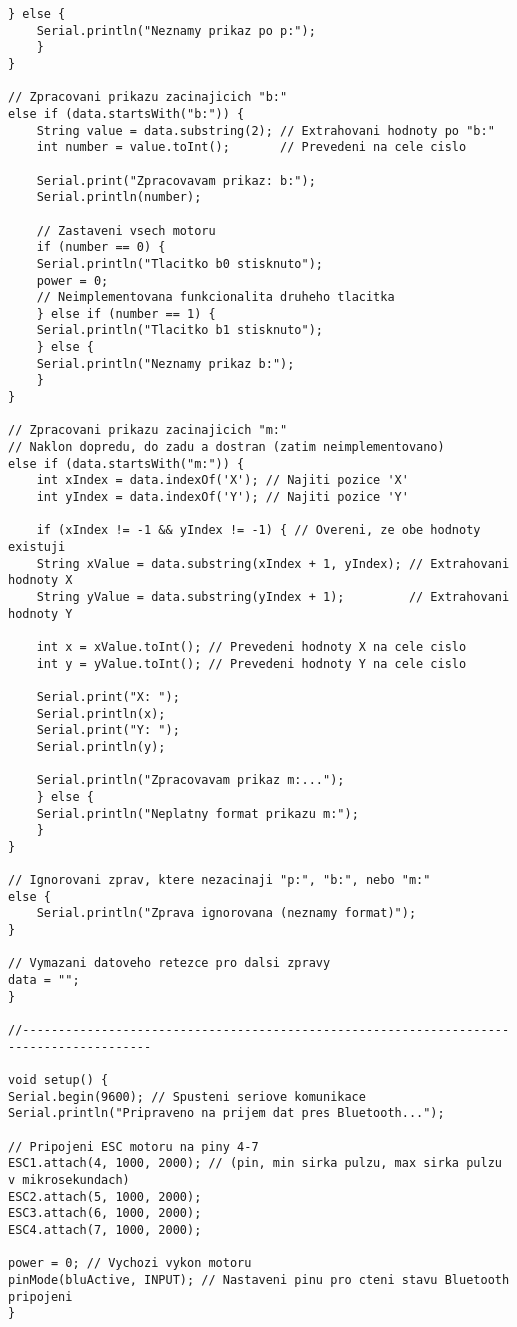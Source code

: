\documentclass[12pt]{report}
\begin{document}
\begin{appendices}
\begin{lstlisting}[title={}, caption={}, label={}, basicstyle=\footnotesize\ttfamily, inputencoding=utf8]
	} else {
	Serial.println("Neznamy prikaz po p:");
	}
}

// Zpracovani prikazu zacinajicich "b:"
else if (data.startsWith("b:")) {
	String value = data.substring(2); // Extrahovani hodnoty po "b:"
	int number = value.toInt();       // Prevedeni na cele cislo

	Serial.print("Zpracovavam prikaz: b:");
	Serial.println(number);

	// Zastaveni vsech motoru
	if (number == 0) {
	Serial.println("Tlacitko b0 stisknuto");
	power = 0;
	// Neimplementovana funkcionalita druheho tlacitka
	} else if (number == 1) {
	Serial.println("Tlacitko b1 stisknuto");
	} else {
	Serial.println("Neznamy prikaz b:");
	}
}

// Zpracovani prikazu zacinajicich "m:"
// Naklon dopredu, do zadu a dostran (zatim neimplementovano)
else if (data.startsWith("m:")) {
	int xIndex = data.indexOf('X'); // Najiti pozice 'X'
	int yIndex = data.indexOf('Y'); // Najiti pozice 'Y'

	if (xIndex != -1 && yIndex != -1) { // Overeni, ze obe hodnoty existuji
	String xValue = data.substring(xIndex + 1, yIndex); // Extrahovani hodnoty X
	String yValue = data.substring(yIndex + 1);         // Extrahovani hodnoty Y

	int x = xValue.toInt(); // Prevedeni hodnoty X na cele cislo
	int y = yValue.toInt(); // Prevedeni hodnoty Y na cele cislo

	Serial.print("X: ");
	Serial.println(x);
	Serial.print("Y: ");
	Serial.println(y);

	Serial.println("Zpracovavam prikaz m:...");
	} else {
	Serial.println("Neplatny format prikazu m:");
	}
}

// Ignorovani zprav, ktere nezacinaji "p:", "b:", nebo "m:"
else {
	Serial.println("Zprava ignorovana (neznamy format)");
}

// Vymazani datoveho retezce pro dalsi zpravy
data = "";
}

//----------------------------------------------------------------------------------------

void setup() {
Serial.begin(9600); // Spusteni seriove komunikace
Serial.println("Pripraveno na prijem dat pres Bluetooth...");

// Pripojeni ESC motoru na piny 4-7
ESC1.attach(4, 1000, 2000); // (pin, min sirka pulzu, max sirka pulzu v mikrosekundach)
ESC2.attach(5, 1000, 2000);
ESC3.attach(6, 1000, 2000);
ESC4.attach(7, 1000, 2000);

power = 0; // Vychozi vykon motoru
pinMode(bluActive, INPUT); // Nastaveni pinu pro cteni stavu Bluetooth pripojeni
}


\end{lstlisting}
\end{appendices}
\end{document}
